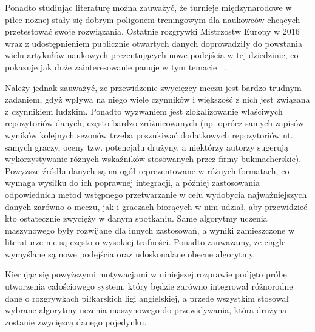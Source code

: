 Ponadto studiując literaturę można zauważyć, że turnieje międzynarodowe w piłce nożnej stały się dobrym poligonem treningowym  dla naukowców chcących przetestować swoje rozwiązania. Ostatnie rozgrywki Mistrzostw Europy w 2016 wraz z udostępnieniem publicznie otwartych danych doprowadziły do powstania wielu artykułów naukowych  prezentujących nowe podejścia w tej dziedzinie, co pokazuje jak duże zainteresowanie panuje w tym temacie~\cite{Euro2016-1} \cite{Euro2016-2} \cite{Euro2016-3}.

Należy jednak zauważyć, ze przewidzenie zwycięzcy meczu jest bardzo trudnym zadaniem, gdyż wpływa na niego wiele czynników i większość z nich jest związana z czynnikiem ludzkim. Ponadto wyzwaniem jest zlokalizowanie właściwych repozytoriów danych, często bardzo zróżnicowanych (np. oprócz samych zapisów wyników kolejnych sezonów trzeba poszukiwać dodatkowych repozytoriów nt. samych graczy, oceny tzw. potencjału drużyny, a niektórzy autorzy sugerują wykorzystywanie różnych wskaźników stosowanych przez firmy bukmacherskie). Powyższe źródła danych są na ogół reprezentowane w różnych formatach, co wymaga wysiłku do ich poprawnej integracji, a później zastosowania odpowiednich metod wstępnego przetwarzanie w celu wydobycia najważniejszych danych zarówno o meczu, jak i graczach biorących w nim udział, aby przewidzieć kto ostatecznie zwycięży w danym spotkaniu. Same algorytmy uczenia maszynowego były rozwijane dla innych zastosowań, a wyniki zamieszczone w literaturze nie są często o wysokiej trafności. Ponadto zauważamy, że ciągle wymyślane są nowe podejścia oraz udoskonalane obecne algorytmy. 

Kierując się powyższymi motywacjami w niniejszej rozprawie podjęto próbę utworzenia całościowego system, który będzie zarówno integrował różnorodne dane o rozgrywkach piłkarskich ligi angielskiej, a przede wszystkim stosował wybrane algorytmy uczenia maszynowego do przewidywania, która drużyna zostanie zwycięzcą danego pojedynku. 

